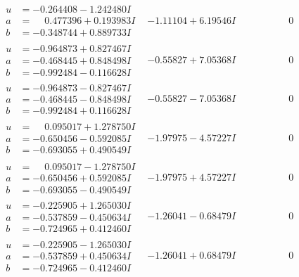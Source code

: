 \documentclass[1p]{elsarticle_modified}
\theoremstyle{definition}
\begin{document}
$$\begin{array}{c|c|c}
\begin{aligned}
u &= -0.264408 - 1.242480 I \\
a &= \phantom{-}0.477396 + 0.193983 I \\
b &= -0.348744 + 0.889733 I\end{aligned}
 & -1.11104 + 6.19546 I & \phantom{-0.000000 } 0 \\ \hline\begin{aligned}
u &= -0.964873 + 0.827467 I \\
a &= -0.468445 + 0.848498 I \\
b &= -0.992484 - 0.116628 I\end{aligned}
 & -0.55827 + 7.05368 I & \phantom{-0.000000 } 0 \\ \hline\begin{aligned}
u &= -0.964873 - 0.827467 I \\
a &= -0.468445 - 0.848498 I \\
b &= -0.992484 + 0.116628 I\end{aligned}
 & -0.55827 - 7.05368 I & \phantom{-0.000000 } 0 \\ \hline\begin{aligned}
u &= \phantom{-}0.095017 + 1.278750 I \\
a &= -0.650456 - 0.592085 I \\
b &= -0.693055 + 0.490549 I\end{aligned}
 & -1.97975 - 4.57227 I & \phantom{-0.000000 } 0 \\ \hline\begin{aligned}
u &= \phantom{-}0.095017 - 1.278750 I \\
a &= -0.650456 + 0.592085 I \\
b &= -0.693055 - 0.490549 I\end{aligned}
 & -1.97975 + 4.57227 I & \phantom{-0.000000 } 0 \\ \hline\begin{aligned}
u &= -0.225905 + 1.265030 I \\
a &= -0.537859 - 0.450634 I \\
b &= -0.724965 + 0.412460 I\end{aligned}
 & -1.26041 - 0.68479 I & \phantom{-0.000000 } 0 \\ \hline\begin{aligned}
u &= -0.225905 - 1.265030 I \\
a &= -0.537859 + 0.450634 I \\
b &= -0.724965 - 0.412460 I\end{aligned}
 & -1.26041 + 0.68479 I & \phantom{-0.000000 } 0 \\ \hline\begin{aligned}

\end{aligned}
\end{array}$$
\end{document}
